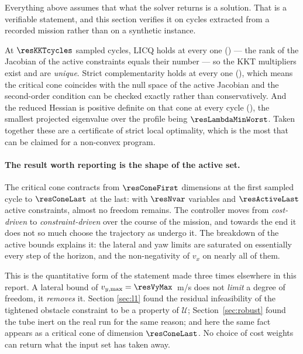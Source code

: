\documentclass[11pt,a4paper]{article}
\begin{document}
Everything above assumes that what the solver returns is a solution. That is a verifiable statement, and this
section verifies it on cycles extracted from a recorded mission rather than on a synthetic instance.


At $\resKKTcycles$ sampled cycles, LICQ holds at every one (\resLICQalways) --- the rank of the Jacobian of
the active constraints equals their number --- so the KKT multipliers exist and are \emph{unique}. Strict
complementarity holds at every one (\resStrictAlways), which means the critical cone coincides with the null
space of the active Jacobian and the second-order condition can be checked exactly rather than
conservatively. And the reduced Hessian is positive definite on that cone at every cycle
(\resSOCalways), the smallest projected eigenvalue over the profile being $\resLambdaMinWorst$. Taken
together these are a certificate of strict local optimality, which is the most that can be claimed for a
non-convex program.

\paragraph{The result worth reporting is the shape of the active set.} The critical cone contracts from
$\resConeFirst$ dimensions at the first sampled cycle to $\resConeLast$ at the last: with $\resNvar$
variables and $\resActiveLast$ active constraints, almost no freedom remains. The controller moves from
\emph{cost-driven} to \emph{constraint-driven} over the course of the mission, and towards the end it does
not so much choose the trajectory as undergo it. The breakdown of the active bounds explains it: the lateral
and yaw limits are saturated on essentially every step of the horizon, and the non-negativity of $v_x$ on
nearly all of them.

This is the quantitative form of the statement made three times elsewhere in this report. A lateral bound of
$v_{y,\max}=\resVyMax$~m/s does not \emph{limit} a degree of freedom, it \emph{removes} it. Section
\ref{sec:l1} found the residual infeasibility of the tightened obstacle constraint to be a property of
$\mathcal{U}$; Section~\ref{sec:robust} found the tube inert on the real run for the same reason; and here
the same fact appears as a critical cone of dimension $\resConeLast$. No choice of cost weights can return
what the input set has taken away.
\end{document}
